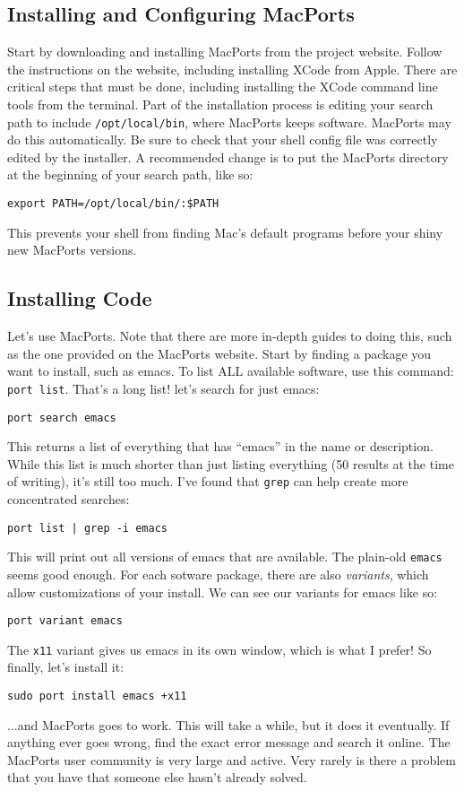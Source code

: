 \documentclass[12pt, letterpaper]{article}
\begin{document}
\subsection{Installing and Configuring MacPorts}
Start by downloading and installing MacPorts from the
project website.  Follow the instructions on the website, including installing
XCode from Apple. There are critical steps that must be done, including
installing the XCode command line tools from the terminal.
Part of the installation process is editing your search
path to include {\tt /opt/local/bin}, where MacPorts keeps software.
MacPorts may do this automatically.
Be sure to check that your shell config file was correctly edited by the
installer.  A recommended change is to put the MacPorts directory at the
beginning of your search path, like so:
\begin{verbatim}
export PATH=/opt/local/bin/:$PATH
\end{verbatim}
This prevents your shell from finding Mac's default programs before your
shiny new MacPorts versions.

\subsection{Installing Code}
Let's use MacPorts.  Note that there are more in-depth guides to doing this,
such as the one provided on the MacPorts website.
Start by finding a package you want to install, such as
emacs.  To list ALL available software, use this command: {\tt port list}.
That's a long list!  let's search for just emacs:
\begin{verbatim}
port search emacs
\end{verbatim}
This returns a list of everything that has ``emacs'' in the name or description.
While this list is much shorter than just listing everything (50 results at the time
of writing), it's still too much.
I've found that {\tt grep} can help create more concentrated searches:
\begin{verbatim}
port list | grep -i emacs
\end{verbatim}
This will print out all versions of emacs that are available.  The plain-old
{\tt emacs} seems good enough.  For each sotware package, there are also
\emph{variants}, which allow customizations of your install.  We can
see our variants for emacs like so:
\begin{verbatim}
port variant emacs
\end{verbatim}
The {\tt x11} variant gives us emacs in its own window, which is what I
prefer!  So finally, let's install it:
\begin{verbatim}
sudo port install emacs +x11
\end{verbatim}
...and MacPorts goes to work. This will take a while, but it does it
eventually.  If anything ever goes wrong, find the exact error message and
search it online.  The MacPorts user community is very large and active.
Very rarely is there a problem that you have that someone else hasn't already
solved.
\end{document}
